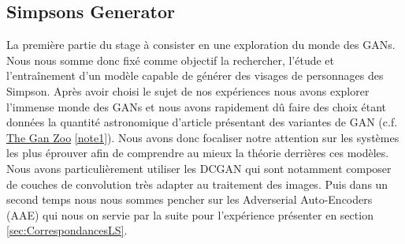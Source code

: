 \documentclass[11pt,francais]{article}
\begin{document}
\subsection{Simpsons Generator}
\label{sec:SimpsonsGenerator}
La première partie du stage à consister en une exploration du monde des GANs. Nous nous somme donc fixé comme objectif la rechercher, l'étude et l'entraînement d'un modèle capable de générer des visages de personnages des Simpson.
Après avoir choisi le sujet de nos expériences nous avons explorer l'immense monde des GANs et nous avons rapidement dû faire des choix étant données la quantité astronomique d'article présentant des variantes de GAN (c.f. \href{https://github.com/hindupuravinash/the-gan-zoo}{The Gan Zoo} \ref{note1}).
Nous avons donc focaliser notre attention sur les systèmes les plus éprouver afin de comprendre au mieux la théorie derrières ces modèles.\\
Nous avons particulièrement utiliser les DCGAN \cite{radford2015unsupervised} qui sont notamment composer de couches de convolution très adapter au traitement des images. Puis dans un second temps nous nous sommes pencher sur les Adverserial Auto-Encoders (AAE)  qui nous on servie par la suite pour l'expérience présenter en section \ref{sec:CorrespondancesLS}.
\end{document}
